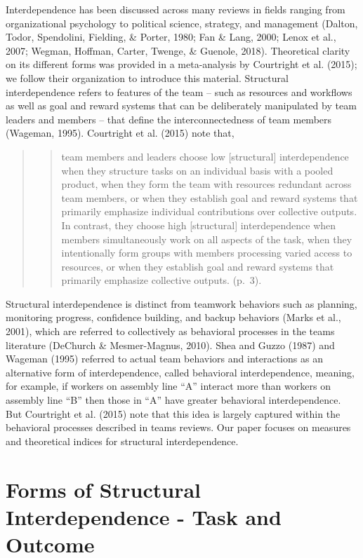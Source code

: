 \documentclass[english,,man]{apa6}
\theoremstyle{definition}
\theoremstyle{definition}
\theoremstyle{definition}
\theoremstyle{remark}
\begin{document}
Interdependence has been discussed across many reviews in fields ranging
from organizational psychology to political science, strategy, and
management (Dalton, Todor, Spendolini, Fielding, \& Porter, 1980; Fan \&
Lang, 2000; Lenox et al., 2007; Wegman, Hoffman, Carter, Twenge, \&
Guenole, 2018). Theoretical clarity on its different forms was provided
in a meta-analysis by Courtright et al. (2015); we follow their
organization to introduce this material. Structural interdependence
refers to features of the team -- such as resources and workflows as
well as goal and reward systems that can be deliberately manipulated by
team leaders and members -- that define the interconnectedness of team
members (Wageman, 1995). Courtright et al. (2015) note that,

\begin{quote}
\begin{quote}
team members and leaders choose low {[}structural{]} interdependence
when they structure tasks on an individual basis with a pooled product,
when they form the team with resources redundant across team members, or
when they establish goal and reward systems that primarily emphasize
individual contributions over collective outputs. In contrast, they
choose high {[}structural{]} interdependence when members simultaneously
work on all aspects of the task, when they intentionally form groups
with members processing varied access to resources, or when they
establish goal and reward systems that primarily emphasize collective
outputs. (p.~3).
\end{quote}
\end{quote}

Structural interdependence is distinct from teamwork behaviors such as
planning, monitoring progress, confidence building, and backup behaviors
(Marks et al., 2001), which are referred to collectively as behavioral
processes in the teams literature (DeChurch \& Mesmer-Magnus, 2010).
Shea and Guzzo (1987) and Wageman (1995) referred to actual team
behaviors and interactions as an alternative form of interdependence,
called behavioral interdependence, meaning, for example, if workers on
assembly line \enquote{A} interact more than workers on assembly line
\enquote{B} then those in \enquote{A} have greater behavioral
interdependence. But Courtright et al. (2015) note that this idea is
largely captured within the behavioral processes described in teams
reviews. Our paper focuses on measures and theoretical indices for
structural interdependence.

\hypertarget{forms-of-structural-interdependence---task-and-outcome}{%
\section{Forms of Structural Interdependence - Task and
Outcome}\label{forms-of-structural-interdependence---task-and-outcome}}
\end{document}
